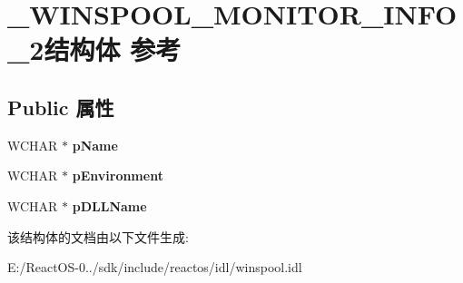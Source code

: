 \hypertarget{struct___w_i_n_s_p_o_o_l___m_o_n_i_t_o_r___i_n_f_o__2}{}\section{\+\_\+\+W\+I\+N\+S\+P\+O\+O\+L\+\_\+\+M\+O\+N\+I\+T\+O\+R\+\_\+\+I\+N\+F\+O\+\_\+2结构体 参考}
\label{struct___w_i_n_s_p_o_o_l___m_o_n_i_t_o_r___i_n_f_o__2}
\subsection*{Public 属性}
\begin{DoxyCompactItemize}
\item 
\mbox{\label{struct___w_i_n_s_p_o_o_l___m_o_n_i_t_o_r___i_n_f_o__2_a9c6afa1dd52963a6978ea72f0ab2de19}} 
W\+C\+H\+AR $\ast$ {\bfseries p\+Name}
\item 
\mbox{\label{struct___w_i_n_s_p_o_o_l___m_o_n_i_t_o_r___i_n_f_o__2_a34ff7e13d60251976c4898c94c5e41c9}} 
W\+C\+H\+AR $\ast$ {\bfseries p\+Environment}
\item 
\mbox{\label{struct___w_i_n_s_p_o_o_l___m_o_n_i_t_o_r___i_n_f_o__2_a7c090977e94233b9921d7400094ad025}} 
W\+C\+H\+AR $\ast$ {\bfseries p\+D\+L\+L\+Name}
\end{DoxyCompactItemize}


该结构体的文档由以下文件生成\+:\begin{DoxyCompactItemize}
\item 
E\+:/\+React\+O\+S-\/0../sdk/include/reactos/idl/winspool.\+idl\end{DoxyCompactItemize}
